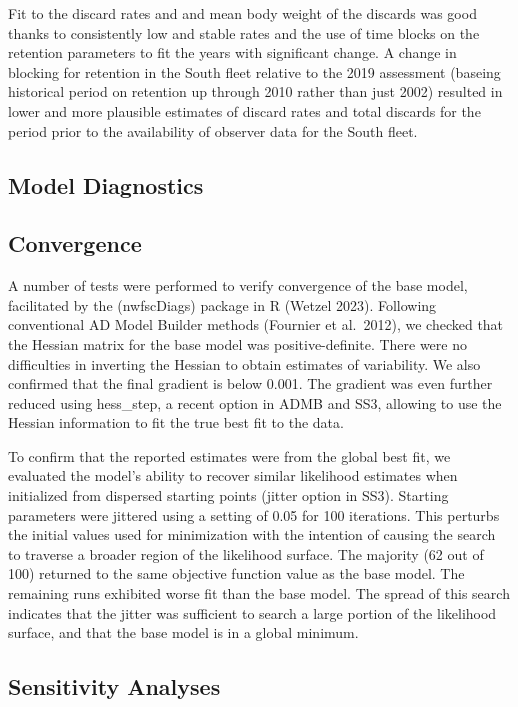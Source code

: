 \documentclass[
]{scrartcl}
\begin{document}
Fit to the discard rates and and mean body weight of the discards was
good thanks to consistently low and stable rates and the use of time
blocks on the retention parameters to fit the years with significant
change. A change in blocking for retention in the South fleet relative
to the 2019 assessment (baseing historical period on retention up
through 2010 rather than just 2002) resulted in lower and more plausible
estimates of discard rates and total discards for the period prior to
the availability of observer data for the South fleet.

\subsection{Model Diagnostics}\label{model-diagnostics}

\subsection{Convergence}\label{convergence}

A number of tests were performed to verify convergence of the base
model, facilitated by the (nwfscDiags) package in R (Wetzel 2023).
Following conventional AD Model Builder methods (Fournier et al.~2012),
we checked that the Hessian matrix for the base model was
positive-definite. There were no difficulties in inverting the Hessian
to obtain estimates of variability. We also confirmed that the final
gradient is below 0.001. The gradient was even further reduced using
hess\_step, a recent option in ADMB and SS3, allowing to use the Hessian
information to fit the true best fit to the data.

To confirm that the reported estimates were from the global best fit, we
evaluated the model's ability to recover similar likelihood estimates
when initialized from dispersed starting points (jitter option in SS3).
Starting parameters were jittered using a setting of 0.05 for 100
iterations. This perturbs the initial values used for minimization with
the intention of causing the search to traverse a broader region of the
likelihood surface. The majority (62 out of 100) returned to the same
objective function value as the base model. The remaining runs exhibited
worse fit than the base model. The spread of this search indicates that
the jitter was sufficient to search a large portion of the likelihood
surface, and that the base model is in a global minimum.

\subsection{Sensitivity Analyses}\label{sensitivity-analyses}
\end{document}
